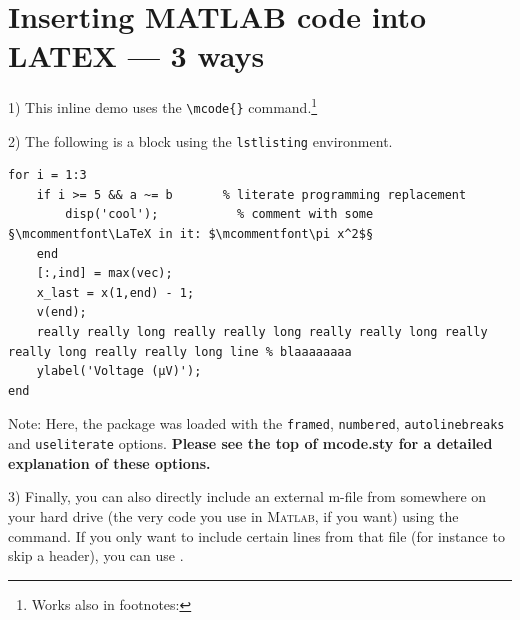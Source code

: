 \documentclass{article}
\begin{document}
\newpage
\section{Inserting MATLAB code into LATEX --- 3 ways}

1) This inline demo  uses the \verb|\mcode{}| command.\footnote{Works also in footnotes: }

2) The following is a block using the \verb|lstlisting| environment.
\begin{lstlisting}
for i = 1:3
	if i >= 5 && a ~= b       % literate programming replacement
		disp('cool');           % comment with some §\mcommentfont\LaTeX in it: $\mcommentfont\pi x^2$§
	end
	[:,ind] = max(vec);
	x_last = x(1,end) - 1;
	v(end);
	really really long really really long really really long really really long really really long line % blaaaaaaaa
	ylabel('Voltage (µV)');
end
\end{lstlisting}
Note: Here, the package was loaded with the \verb|framed|, \verb|numbered|, \verb|autolinebreaks| and \verb|useliterate| options.  \textbf{Please see the top of mcode.sty for a detailed explanation of these options.}


3) Finally, you can also directly include an external m-file from somewhere on your hard drive (the very code you use in \textsc{Matlab}, if you want) using the \verb|| command.  If you only want to include certain lines from that file (for instance to skip a header), you can use \verb||.
\end{document}

